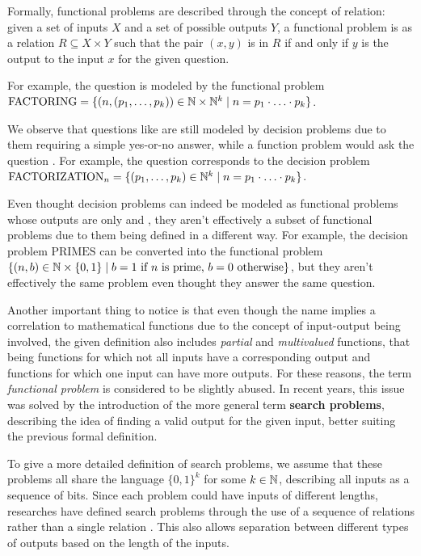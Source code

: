 Formally, functional problems are described through the concept of relation: given a set of inputs $X$ and a set of possible outputs $Y$, a functional problem is as a relation $R \subseteq X \times Y$ such that the pair $(x,y)$ is in $R$ if and only if $y$ is the output to the input $x$ for the given question.

For example, the question  is modeled by the functional problem $\mathrm{FACTORING} = \{(n, (p_1, \ldots, p_k)) \in \mathbb{N} \times \mathbb{N}^k \mid n = p_1 \cdot \ldots \cdot p_k\}$.

We observe that questions like  are still modeled by decision problems due to them requiring a simple yes-or-no answer, while a function problem would ask the question . For example, the question  corresponds to the decision problem $\mathrm{FACTORIZATION}_n = \{(p_1, \ldots, p_k) \in \mathbb{N}^k \mid n = p_1 \cdot \ldots \cdot p_k\}$.

Even thought decision problems can indeed be modeled as functional problems whose outputs are only  and , they aren't effectively a subset of functional problems due to them being defined in a different way. For example, the decision problem $\mathrm{PRIMES}$ can be converted into the functional problem $\{(n, b) \in \mathbb{N} \times \{0,1\} \mid b = 1 \text{ if } n \text{ is prime, } b = 0 \text{ otherwise}\}$, but they aren't effectively the same problem even thought they answer the same question.

Another important thing to notice is that even though the name implies a correlation to mathematical functions due to the concept of input-output being involved, the given definition also includes \textit{partial} and \textit{multivalued} functions, that being functions for which not all inputs have a corresponding output and functions for which one input can have more outputs. For these reasons, the term \textit{functional problem} is considered to be slightly abused. In recent years, this issue was solved by the introduction of the more general term \textbf{search problems}, describing the idea of finding a valid output for the given input, better suiting the previous formal definition.

To give a more detailed definition of search problems, we assume that these problems all share the language $\{0,1\}^k$ for some $k \in \mathbb{N}$, describing all inputs as a sequence of bits. Since each problem could have inputs of different lengths, researches have defined search problems through the use of a sequence of relations rather than a single relation \cite{rel_comp_np_search, proofs_circuits_communication, tfnp_characterization}. This also allows separation between different types of outputs based on the length of the inputs.

